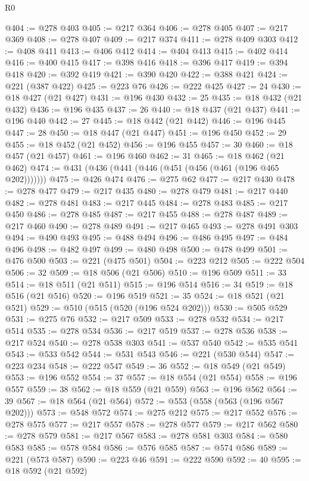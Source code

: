 \begin{lexlean}{R0}
\begin{coremodule}
@404 := @278 @403
@405 := @217 @364
@406 := @278 @405
@407 := @217 @369
@408 := @278 @407
@409 := @217 @374
@411 := @278 @409 @303
@412 := @408 @411
@413 := @406 @412
@414 := @404 @413
@415 := @402 @414
@416 := @400 @415
@417 := @398 @416
@418 := @396 @417
@419 := @394 @418
@420 := @392 @419
@421 := @390 @420
@422 := @388 @421
@424 := @221 (@387 @422)
@425 := @223 @76
@426 := @222 @425
@427 := 24
@430 := @18 @427 (@21 @427)
@431 := @196 @430
@432 := 25
@435 := @18 @432 (@21 @432)
@436 := @196 @435
@437 := 26
@440 := @18 @437 (@21 @437)
@441 := @196 @440
@442 := 27
@445 := @18 @442 (@21 @442)
@446 := @196 @445
@447 := 28
@450 := @18 @447 (@21 @447)
@451 := @196 @450
@452 := 29
@455 := @18 @452 (@21 @452)
@456 := @196 @455
@457 := 30
@460 := @18 @457 (@21 @457)
@461 := @196 @460
@462 := 31
@465 := @18 @462 (@21 @462)
@474 := @431 (@436 (@441 (@446 (@451 (@456 (@461 (@196 @465 @202)))))))
@475 := @426 @474
@476 := @275 @62
@477 := @217 @430
@478 := @278 @477
@479 := @217 @435
@480 := @278 @479
@481 := @217 @440
@482 := @278 @481
@483 := @217 @445
@484 := @278 @483
@485 := @217 @450
@486 := @278 @485
@487 := @217 @455
@488 := @278 @487
@489 := @217 @460
@490 := @278 @489
@491 := @217 @465
@493 := @278 @491 @303
@494 := @490 @493
@495 := @488 @494
@496 := @486 @495
@497 := @484 @496
@498 := @482 @497
@499 := @480 @498
@500 := @478 @499
@501 := @476 @500
@503 := @221 (@475 @501)
@504 := @223 @212
@505 := @222 @504
@506 := 32
@509 := @18 @506 (@21 @506)
@510 := @196 @509
@511 := 33
@514 := @18 @511 (@21 @511)
@515 := @196 @514
@516 := 34
@519 := @18 @516 (@21 @516)
@520 := @196 @519
@521 := 35
@524 := @18 @521 (@21 @521)
@529 := @510 (@515 (@520 (@196 @524 @202)))
@530 := @505 @529
@531 := @275 @76
@532 := @217 @509
@533 := @278 @532
@534 := @217 @514
@535 := @278 @534
@536 := @217 @519
@537 := @278 @536
@538 := @217 @524
@540 := @278 @538 @303
@541 := @537 @540
@542 := @535 @541
@543 := @533 @542
@544 := @531 @543
@546 := @221 (@530 @544)
@547 := @223 @234
@548 := @222 @547
@549 := 36
@552 := @18 @549 (@21 @549)
@553 := @196 @552
@554 := 37
@557 := @18 @554 (@21 @554)
@558 := @196 @557
@559 := 38
@562 := @18 @559 (@21 @559)
@563 := @196 @562
@564 := 39
@567 := @18 @564 (@21 @564)
@572 := @553 (@558 (@563 (@196 @567 @202)))
@573 := @548 @572
@574 := @275 @212
@575 := @217 @552
@576 := @278 @575
@577 := @217 @557
@578 := @278 @577
@579 := @217 @562
@580 := @278 @579
@581 := @217 @567
@583 := @278 @581 @303
@584 := @580 @583
@585 := @578 @584
@586 := @576 @585
@587 := @574 @586
@589 := @221 (@573 @587)
@590 := @223 @46
@591 := @222 @590
@592 := 40
@595 := @18 @592 (@21 @592)

\end{coremodule}
\end{lexlean}
